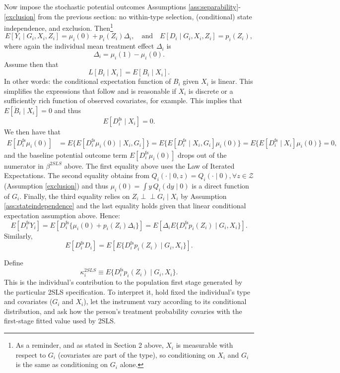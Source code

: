 \documentclass[11pt]{article}
\newcommand{\1}{\mathbf{1}}
\newcommand{\cZ}{\mathcal{Z}}
\newcommand{\dd}{\mathrm{d}}
\newcommand{\Perp}{\perp \!\!\! \perp}
\begin{document}
Now impose the stochastic potential outcomes Assumptions \ref{ass:separability}-\ref{exclusion} from the previous section: no within-type
selection, (conditional) state independence, and exclusion. Then\footnote{As a reminder, and as stated in Section 2 above, $X_i$ is measurable with respect to $G_i$ (covariates are part of the type), so conditioning on $X_i$ and $G_i$ is the same as conditioning on $G_i$ alone.}
\[
E[Y_i\mid G_i,X_i,Z_i]
=
\mu_i(0)+p_i(Z_i)\Delta_i,
\quad \textrm{and} \quad
E[D_i\mid G_i,X_i,Z_i]
=
p_i(Z_i),
\]
where again the individual mean treatment effect $\Delta_i$ is
\[
\Delta_i=\mu_i(1)-\mu_i(0).
\]
Assume then that 
\[
L[B_i\mid X_i] = E[B_i \mid X_i].
\]
In other words: the conditional expectation function of $B_i$ given $X_i$ is linear.  This simplifies the expressions that follow and is reasonable if $X_i$ is discrete or a sufficiently rich function of observed covariates, for example. This implies that $E[\ddot B_i \mid X_i]=0$ and thus
\[
E[D_i^{\mathrm{fs}}\mid X_i]=0.
\]
We then have that
\begin{align*}
E[D_i^{\mathrm{fs}} \mu_i(0)] & = E\{E[D_i^{\mathrm{fs}} \mu_i(0) \mid X_i,G_i]\} = E\{E[D_i^{\mathrm{fs}} \mid X_i,G_i] \mu_i(0) \} = E\{E[D_i^{\mathrm{fs}} \mid X_i] \mu_i(0) \} = 0,
\end{align*}
and the baseline potential outcome term $E[D_i^{\mathrm{fs}} \mu_i(0)]$ drops out of the numerator in $\beta^{2SLS}$ above.  The first equality above uses the Law of Iterated Expectations. The second equality obtains from $Q_i(\cdot\mid 0,z)=Q_i(\cdot\mid 0), \forall z \in \cZ$ (Assumption \ref{exclusion}) and thus $\mu_i(0)=\int y\,Q_i(\dd y\mid 0)$ is a direct function of $G_i$.  Finally, the third equality relies on \(Z_i\Perp G_i\mid X_i\) by Assumption \ref{ass:stateindependence} and the last equality holds given that linear conditional expectation assumption above.  Hence:
\[
E[D_i^{\mathrm{fs}}Y_i]
=
E\!\left[D_i^{\mathrm{fs}}\{\mu_i(0)+p_i(Z_i)\Delta_i\}\right]
=
E\!\left[\Delta_i
E\{D_i^{\mathrm{fs}}p_i(Z_i)\mid G_i,X_i\}\right].
\]
Similarly,
\[
E[D_i^{\mathrm{fs}}D_i]
=
E\!\left[E\{D_i^{\mathrm{fs}}p_i(Z_i)\mid G_i,X_i\}\right].
\]

Define
\[
\kappa_i^{2SLS}
\equiv
E\{D_i^{\mathrm{fs}}p_i(Z_i)\mid G_i,X_i\}.
\]
This is the individual's contribution to the population first stage generated by the
particular 2SLS specification. To interpret it, hold fixed the individual's type and
covariates ($G_i$ and $X_i$), let the instrument vary according to its conditional distribution, and ask
how the person's treatment probability covaries with the first-stage fitted value used
by 2SLS.
\end{document}
